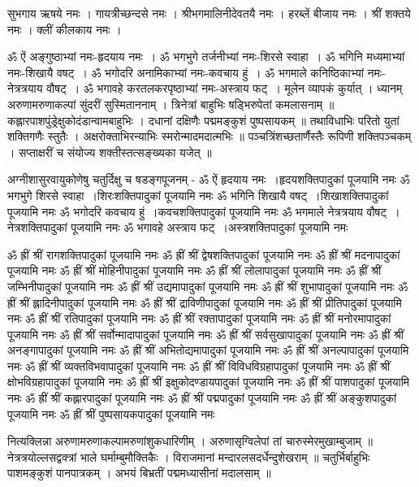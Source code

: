 सुभगाय ऋषये नमः । गायत्रीच्छन्दसे नमः । श्रीभगमालिनीदेवतयै नमः । हरब्लें बीजाय नमः । श्रीं शक्तये नमः । क्लीं कीलकाय नमः ।


ॐ ऐं अङ्गुष्ठाभ्यां नमः-हृदयाय नमः~। 
ॐ भगभुगे तर्जनीभ्यां नमः-शिरसे स्वाहा~।
ॐ भगिनि मध्यमाभ्यां नमः-शिखायै वषट्~।
ॐ भगोदरि अनामिकाभ्यां नमः-कवचाय हुं~।
ॐ भगमाले कनिष्ठिकाभ्यां नमः-नेत्रत्रयाय वौषट्~।
ॐ भगावहे करतलकरपृष्ठाभ्यां नमः-अस्त्राय फट्~।
मूलेन व्यापकं कुर्यात् ।
ध्यानम्
अरुणामरुणाकल्पां सुंदरीं सुस्मिताननाम् ।
त्रिनेत्रां बाहुभिः षड्भिरुपेतां कमलासनाम् ॥
कह्लारपाशपुंड्रेक्षुकोदंडान्वामबाहुभिः ।
दधानां दक्षिणैः पद्ममङ्कुशं पुष्पसायकम् ॥
तथाविधाभिः परितो युतां शक्तिगणैः स्तुतैः ।
अक्षरोक्ताभिरन्याभिः स्मरोन्मादमदात्मभिः ॥
पञ्चत्रिंशच्छतार्णैस्तैः रूपिणी शक्तिपञ्चकम् ।
सप्ताक्षरीं च संयोज्य शक्तीस्तत्सङ्ख्यका यजेत् ॥

अग्नीशासुरवायुकोणेषु चतुर्दिक्षु च षडङ्गपूजनम् -
ॐ ऐं हृदयाय नमः~।हृदयशक्तिपादुकां पूजयामि नमः
ॐ भगभुगे शिरसे स्वाहा~।शिरःशक्तिपादुकां पूजयामि नमः
ॐ भगिनि शिखायै वषट्~।शिखाशक्तिपादुकां पूजयामि नमः
ॐ भगोदरि कवचाय हुं~।कवचशक्तिपादुकां पूजयामि नमः
ॐ भगमाले नेत्रत्रयाय वौषट्~।नेत्रशक्तिपादुकां पूजयामि नमः
ॐ भगावहे अस्त्राय फट्~।अस्त्रशक्तिपादुकां पूजयामि नमः

ॐ ह्रीं श्रीं रागशक्तिपादुकां पूजयामि नमः
ॐ ह्रीं श्रीं द्वेषशक्तिपादुकां पूजयामि नमः
ॐ ह्रीं श्रीं मदनापादुकां पूजयामि नमः
ॐ ह्रीं श्रीं मोहिनीपादुकां पूजयामि नमः
ॐ ह्रीं श्रीं लोलापादुकां पूजयामि नमः
ॐ ह्रीं श्रीं जम्भिनीपादुकां पूजयामि नमः
ॐ ह्रीं श्रीं उद्यमापादुकां पूजयामि नमः
ॐ ह्रीं श्रीं शुभापादुकां पूजयामि नमः
ॐ ह्रीं श्रीं ह्लादिनीपादुकां पूजयामि नमः
ॐ ह्रीं श्रीं द्राविणीपादुकां पूजयामि नमः
ॐ ह्रीं श्रीं प्रीतिपादुकां पूजयामि नमः
ॐ ह्रीं श्रीं रतिपादुकां पूजयामि नमः
ॐ ह्रीं श्रीं रक्तापादुकां पूजयामि नमः
ॐ ह्रीं श्रीं मनोरमापादुकां पूजयामि नमः
ॐ ह्रीं श्रीं सर्वोन्मादापादुकां पूजयामि नमः
ॐ ह्रीं श्रीं सर्वसुखापादुकां पूजयामि नमः
ॐ ह्रीं श्रीं अनङ्गापादुकां पूजयामि नमः
ॐ ह्रीं श्रीं अभितोद्यमापादुकां पूजयामि नमः
ॐ ह्रीं श्रीं अनल्पापादुकां पूजयामि नमः
ॐ ह्रीं श्रीं व्यक्तविभवापादुकां पूजयामि नमः
ॐ ह्रीं श्रीं विविधविग्रहापादुकां पूजयामि नमः
ॐ ह्रीं श्रीं क्षोभविग्रहापादुकां पूजयामि नमः
ॐ ह्रीं श्रीं इक्षुकोदण्डायपादुकां पूजयामि नमः
ॐ ह्रीं श्रीं पाशपादुकां पूजयामि नमः
ॐ ह्रीं श्रीं कह्लारपादुकां पूजयामि नमः
ॐ ह्रीं श्रीं पद्मपादुकां पूजयामि नमः
ॐ ह्रीं श्रीं अङ्कुशपादुकां पूजयामि नमः
ॐ ह्रीं श्रीं पुष्पसायकपादुकां पूजयामि नमः

नित्यक्लिन्ना 
अरुणामरुणाकल्पामरुणांशुकधारिणीम् । अरुणासृग्विलेपां तां चारुस्मेरमुखाम्बुजाम् ॥
नेत्रत्रयोल्लसद्वक्त्रां भाले घर्माम्बुमौक्तिकैः । विराजमानां मन्दारलसदर्धेन्दुशेखराम् ॥
चतुर्भिर्बाहुभिः पाशमङ्कुशं पानपात्रकम् । अभयं बिभ्रतीं पद्ममध्यासीनां मदालसाम् ॥

